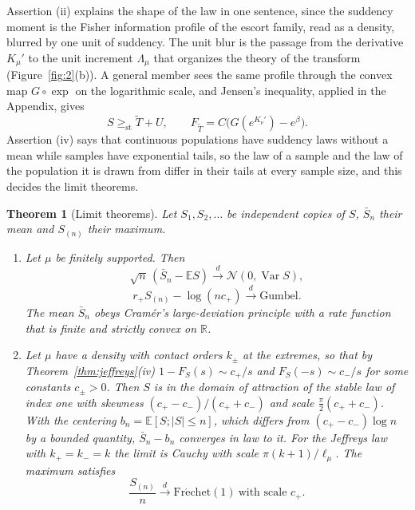 \documentclass[sn-mathphys-num]{sn-jnl}\newcommand{\SNJNL}{}
\theoremstyle{thmstyleone}
\newtheorem{theorem}{Theorem}
\theoremstyle{thmstyletwo}
\theoremstyle{thmstylethree}
\theoremstyle{thmstyleone}
\providecommand{\R}{\mathbb{R}}
\providecommand{\E}{\mathbb{E}}
\providecommand{\Var}{\operatorname{Var}}
\providecommand{\st}{\mathrm{st}}
\begin{document}
	Assertion (ii) explains the shape of the law in one sentence, since
	the suddency moment is the Fisher information profile of the escort
	family, read as a density, blurred by one unit of suddency. The unit
	blur is the passage from the derivative $K_\mu'$ to the unit
	increment $\Lambda_\mu$ that organizes the theory of the transform
	(Figure~\ref{fig:2}(b)). A general member sees the same profile
	through the convex map $G\circ\exp$ on the logarithmic scale, and Jensen's inequality, applied in the Appendix, gives
	\begin{equation}\label{eq:jensen}
		S\ge_{\st}\widetilde T+U,
		\qquad
		F_{\widetilde T}=C\bigl(G(e^{K_\nu'})-e^{\beta}\bigr).
	\end{equation}
	Assertion (iv) says that continuous populations have suddency laws
	without a mean while samples have exponential tails, so the law of a
	sample and the law of the population it is drawn from differ in
	their tails at every sample size, and this decides the limit
	theorems.
	
	\begin{theorem}[Limit theorems]\label{thm:limits}
		Let $S_1,S_2,\dots$ be independent copies of $S$, $\bar S_n$ their
		mean and $S_{(n)}$ their maximum.
		\begin{enumerate}[label=\textup{(\roman*)},leftmargin=2.2em]
			\item Let $\mu$ be finitely supported. Then
			\begin{equation}\label{eq:clt}
				\sqrt n\,(\bar S_n-\E S)\xrightarrow{d}\mathcal N(0,\Var S),
			\end{equation}
			\begin{equation}\label{eq:gumbelmax}
				r_+S_{(n)}-\log(nc_+)\xrightarrow{d}\mathrm{Gumbel}.
			\end{equation}
			The mean $\bar S_n$ obeys Cram\'er's large-deviation principle
			with a rate function that is finite and strictly convex on $\R$.
			\item Let $\mu$ have a density with contact orders $k_\pm$ at the
			extremes, so that by Theorem~\ref{thm:jeffreys}(iv)
			$1-F_S(s)\sim c_+/s$ and $F_S(-s)\sim c_-/s$ for some constants
			$c_\pm>0$.
			Then $S$ is in the domain of attraction of the stable law of
			index one with skewness $(c_+-c_-)/(c_++c_-)$ and scale
			$\tfrac\pi2(c_++c_-)$. With the centering $b_n=\E[S;|S|\le n]$, which differs from
			$(c_+-c_-)\log n$ by a bounded quantity, $\bar S_n-b_n$ converges
			in law to it. For the Jeffreys law with
			$k_+=k_-=k$ the limit is Cauchy with scale $\pi(k+1)/\ell_\mu$.
			The maximum satisfies
			\begin{equation}\label{eq:frechet}
				\frac{S_{(n)}}{n}\xrightarrow{d}\mathrm{Fr\acute echet}(1)\ \text{with scale }c_+ .
			\end{equation}
		\end{enumerate}
	\end{theorem}
	
\end{document}
